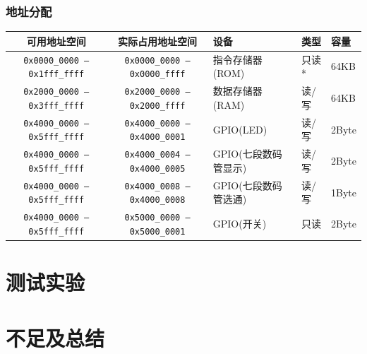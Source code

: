 \documentclass[lang=cn,11pt,a4paper]{elegantpaper}
\begin{document}
\subsubsection{地址分配}
\begin{table}[h!]
    \centering
    \begin{tabular}{cclll}
        \toprule
        可用地址空间 & 实际占用地址空间 & 设备 & 类型 & 容量\\
        \midrule
        \texttt{0x0000\_0000 --- 0x1fff\_ffff} & \texttt{0x0000\_0000 --- 0x0000\_ffff} & 指令存储器(ROM) & 只读* & 64KB\\
        \texttt{0x2000\_0000 --- 0x3fff\_ffff} & \texttt{0x2000\_0000 --- 0x2000\_ffff} & 数据存储器(RAM) & 读/写 & 64KB\\
        \texttt{0x4000\_0000 --- 0x5fff\_ffff} & \texttt{0x4000\_0000 --- 0x4000\_0001} & GPIO(LED)       & 读/写 & 2Byte \\
        \texttt{0x4000\_0000 --- 0x5fff\_ffff} & \texttt{0x4000\_0004 --- 0x4000\_0005} & GPIO(七段数码管显示) & 读/写 & 2Byte \\
        \texttt{0x4000\_0000 --- 0x5fff\_ffff} & \texttt{0x4000\_0008 --- 0x4000\_0008} & GPIO(七段数码管选通) & 读/写 & 1Byte \\
        \texttt{0x4000\_0000 --- 0x5fff\_ffff} & \texttt{0x5000\_0000 --- 0x5000\_0001} & GPIO(开关)       & 只读  & 2Byte \\
        \bottomrule
    \end{tabular}
\end{table}
\section{测试实验}
\section{不足及总结}
\end{document}
